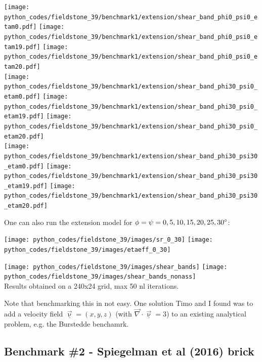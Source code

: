 \newpage
\begin{center}
\texttt{[image: python\_codes/fieldstone\_39/benchmark1/extension/shear\_band\_phi0\_psi0\_etam0.pdf]}
\texttt{[image: python\_codes/fieldstone\_39/benchmark1/extension/shear\_band\_phi0\_psi0\_etam19.pdf]}
\texttt{[image: python\_codes/fieldstone\_39/benchmark1/extension/shear\_band\_phi0\_psi0\_etam20.pdf]}\\
\texttt{[image: python\_codes/fieldstone\_39/benchmark1/extension/shear\_band\_phi30\_psi0\_etam0.pdf]}
\texttt{[image: python\_codes/fieldstone\_39/benchmark1/extension/shear\_band\_phi30\_psi0\_etam19.pdf]}
\texttt{[image: python\_codes/fieldstone\_39/benchmark1/extension/shear\_band\_phi30\_psi0\_etam20.pdf]}\\
\texttt{[image: python\_codes/fieldstone\_39/benchmark1/extension/shear\_band\_phi30\_psi30\_etam0.pdf]}
\texttt{[image: python\_codes/fieldstone\_39/benchmark1/extension/shear\_band\_phi30\_psi30\_etam19.pdf]}
\texttt{[image: python\_codes/fieldstone\_39/benchmark1/extension/shear\_band\_phi30\_psi30\_etam20.pdf]}
\end{center}


\newpage
One can also run the extension model for $\phi=\psi={0,5,10,15,20,25,30}\degree$:
\begin{center}
\texttt{[image: python\_codes/fieldstone\_39/images/sr\_0\_30]}
\texttt{[image: python\_codes/fieldstone\_39/images/etaeff\_0\_30]}\\
\end{center}




\begin{center}
\texttt{[image: python\_codes/fieldstone\_39/images/shear\_bands]}
\texttt{[image: python\_codes/fieldstone\_39/images/shear\_bands\_nonass]}\\
Results obtained on a 240x24 grid, max 50 nl iterations.
\end{center}


Note that benchmarking this in not easy. One solution Timo and I found was to add a 
velocity field $\underline{\vec\upnu}=(x,y,z)$ (with $\vec\nabla\cdot\underline{\vec\upnu}=3$)
to an existing analytical problem, e.g. the Burstedde benchamrk.

\newpage
\subsection*{Benchmark \#2 - Spiegelman et al (2016) brick}

